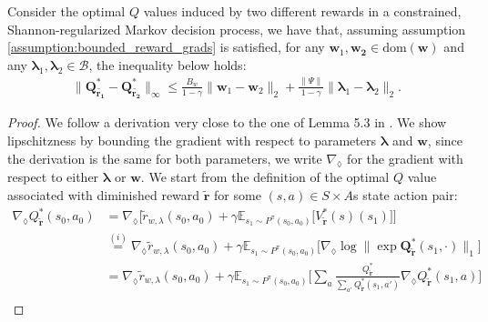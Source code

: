 \begin{lemma}
    \label{lemma:optQ_is_lipschitz_wrt_w}
    Consider the optimal $Q$ values induced by two different rewards in a constrained, Shannon-regularized Markov decision process, we have that, assuming assumption \ref{assumption:bounded_reward_grads} is satisfied, for any $\bm{w}_1,\bm{w_2} \in \text{dom}(\bm{w})$ and any $\bm{\lambda}_1,\bm{\lambda}_2\in\mathcal{B}$, the inequality below holds:
    \begin{align*}
        \| \bm{Q}^{*}_{\tilde{\bm{r_1}}} - \bm{Q}^{*}_{\tilde{\bm{r_2}}} \|_\infty  
        \leq \frac{B_w}{1 - \gamma} \| \bm{w}_1 - \bm{w}_2 \|_2 + \frac{\|\Psi\|}{1 - \gamma} \| \bm{\lambda}_1 - \bm{\lambda}_2 \|_2.
    \end{align*}
    \begin{proof}
        We follow a derivation very close to the one of Lemma 5.3 in \cite{Zeng2022}. We show lipschitzness by bounding the gradient with respect to parameters $\bm{\lambda}$ and $\bm{w}$, since the derivation is the same for both parameters, we write $\nabla_\lozenge$ for the gradient with respect to either $\bm{\lambda}$ or $\bm{w}$. We start from the definition of the optimal $Q$ value associated with diminished reward $\tilde{\bm{r}}$ for some $(s,a)\in S \times A$s state action pair:
        \begin{align*}
            \nabla_\lozenge Q_{\tilde{\bm{r}}}^*(s_0,a_0) 
            &= \nabla_\lozenge \Big[
            \tilde{r}_{w,\lambda}(s_0,a_0)
            +
            \gamma \mathbb{E}_{s_1 \sim P^{\pi}(s_0,a_0)} \big[
                V_{\tilde{\bm{r}}}^*(s) (s_1)
            \big]
            \Big] \\
            &\stackrel{(i)}{=} \nabla_\lozenge 
            \tilde{r}_{w,\lambda}(s_0,a_0)
            +
            \gamma \mathbb{E}_{s_1 \sim P^{\pi}(s_0,a_0)} 
            \Big[
                \nabla_\lozenge 
                \log \big\|
                \exp
                \bm{Q}_{\tilde{\bm{r}}}^*(s_1,\cdot)
                \big\|_1
            \Big]\\
            &= \nabla_\lozenge 
            \tilde{r}_{w,\lambda}(s_0,a_0)
            +
            \gamma \mathbb{E}_{s_1 \sim P^{\pi}(s_0,a_0)} 
            \Bigg[
                \sum_a \frac{Q_{\tilde{\bm{r}}}^*
                }{\sum_{a'} Q_{\tilde{\bm{r}}}^*(s_1,a') }
                \nabla_\lozenge 
                Q_{\tilde{\bm{r}}}^*(s_1,a)
            \Bigg]\\

\end{align*}
\end{proof}
\end{lemma}
